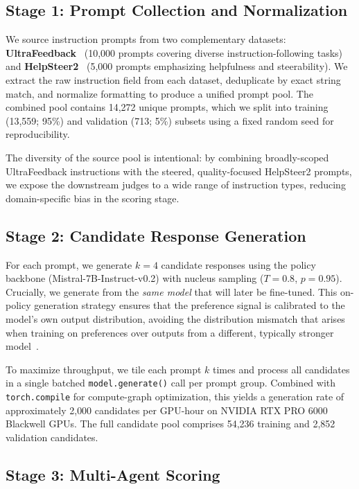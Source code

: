 \documentclass[10pt,twocolumn]{article}
\begin{document}
\subsection{Stage 1: Prompt Collection and Normalization}
\label{sec:prompt}

We source instruction prompts from two complementary datasets:
\textbf{UltraFeedback}~\cite{cui2023ultrafeedback} (10{,}000 prompts covering diverse instruction-following tasks) and \textbf{HelpSteer2}~\cite{wang2024helpsteer2} (5{,}000 prompts emphasizing helpfulness and steerability).
We extract the raw instruction field from each dataset, deduplicate by exact string match, and normalize formatting to produce a unified prompt pool.
The combined pool contains 14{,}272 unique prompts, which we split into training (13{,}559; 95\%) and validation (713; 5\%) subsets using a fixed random seed for reproducibility.

The diversity of the source pool is intentional: by combining broadly-scoped UltraFeedback instructions with the steered, quality-focused HelpSteer2 prompts, we expose the downstream judges to a wide range of instruction types, reducing domain-specific bias in the scoring stage.


\subsection{Stage 2: Candidate Response Generation}
\label{sec:generation}

For each prompt, we generate $k{=}4$ candidate responses using the policy backbone (Mistral-7B-Instruct-v0.2) with nucleus sampling ($T{=}0.8$, $p{=}0.95$).
Crucially, we generate from the \emph{same model} that will later be fine-tuned.
This on-policy generation strategy ensures that the preference signal is calibrated to the model's own output distribution, avoiding the distribution mismatch that arises when training on preferences over outputs from a different, typically stronger model~\cite{gao2023scaling}.

To maximize throughput, we tile each prompt $k$ times and process all candidates in a single batched \texttt{model.generate()} call per prompt group.
Combined with \texttt{torch.compile} for compute-graph optimization, this yields a generation rate of approximately 2{,}000 candidates per GPU-hour on NVIDIA RTX PRO 6000 Blackwell GPUs.
The full candidate pool comprises 54{,}236 training and 2{,}852 validation candidates.


\subsection{Stage 3: Multi-Agent Scoring}
\label{sec:scoring}
\end{document}
